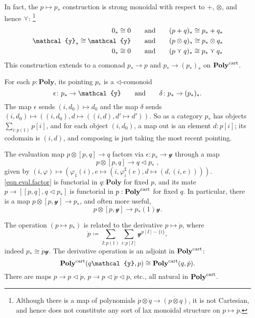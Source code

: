 \documentclass[11pt, one side, article]{memoir}
\theoremstyle{definition}
\theoremstyle{plain}
\newcommand{\Cat}[1]{\mathbf{#1}}%
\newcommand{\tn}[1]{\textnormal{#1}}
\newcommand{\yon}{{\mathcal{y}}}
\newcommand{\poly}{\Cat{Poly}}
\newcommand{\polycart}{\poly^{\tn{cart}}}
\newcommand{\0}{\textsf{0}}
\newcommand{\1}{\tn{\textsf{1}}}
\newcommand{\tri}{\mathbin{\triangleleft}}
\newcommand{\hh}[2][]{#1 \tn{#2} #1}
\newcommand{\qqand}{\hh[\qquad]{and}}
\newcommand{\OR}{\curlyvee}
\begin{document}
In fact, the $p\mapsto p_*$ construction is strong monoidal with respect to $+$, $\otimes$, and hence $\OR$:%
\footnote{Although there is a map of polynomials $\dot{p}\otimes\dot{q}\to\dot{(p\otimes q)}$, it is not Cartesian, and hence does not constitute any sort of lax monoidal structure on $p\mapsto\dot{p}$.}
\begin{align}
	0_*\cong 0
	&\qqand
	(p+q)_*\cong p_*+q_*\\
	\yon_*\cong\yon
	&\qqand
	(p\otimes q)_*\cong p_*\otimes q_*\\
	0_*\cong0
	&\qqand
	(p\OR q)_*\cong p_*\OR q_*
\end{align}
This construction extends to a comonad $p_*\to p$ and $p_*\to (p_*)_*$ on $\polycart$. 

For each $p:\poly$, its pointing $p_*$ is a $\tri$-comonoid
\begin{equation}\label{eqn.pointing_comonad}
	\epsilon\colon p_*\to\yon
	\qqand
	\delta\colon p_*\to (p_*)_*.
\end{equation}
The map $\epsilon$ sends $(i,d_0)\mapsto d_0$ and the map $\delta$ sends $(i,d_0)\mapsto((i,d_0), d\mapsto ((i,d), d'\mapsto d'))$. So as a category $p_*$ has objects $\sum_{i:p(1)}p[i]$, and for each object $(i,d_0)$, a map out is an element $d:p[i]$; its codomain is $(i,d)$, and composing is just taking the most recent pointing.

The evaluation map $p\otimes [p,q]\to q$ factors via $\epsilon\colon p_*\to \yon$ through a map
\begin{equation}\label{eqn.eval.factor}
	p\otimes [p,q]\to q\tri p_*\;,
\end{equation}
given by $(i,\varphi)\mapsto (\varphi_1(i),e\mapsto(i,\varphi^\sharp_i(e),d\mapsto(d,(i,e))))$. \cref{eqn.eval.factor} is functorial in $q:\poly$ for fixed $p$, and its mate $p\to[[p,q],q\tri p_*]$ is functorial in $p:\polycart$ for fixed $q$. In particular, there is a map $p\otimes[p,\yon]\to p_*$, and often more useful,
\begin{equation}
	p\otimes [p,\yon]\to p_*(1)\yon.
\end{equation}

The operation $(p\mapsto p_*)$ is related to the derivative $p\mapsto\dot{p}$, where
\begin{equation}
\dot{p}\coloneqq\sum_{I:p(1)}\sum_{i:p[I]}\yon^{p[I]-\{i\}},
\end{equation}
indeed $p_*\cong\dot{p}\yon$. The derivative operation is an adjoint in $\polycart$:
\begin{equation}
  \polycart(q\yon,p)\cong
  \polycart(q,\dot{p}).
\end{equation}
There are maps $p\to p\tri\dot{p}$, $p\to p\tri\dot{p}\tri\ddot{p}$, etc., all natural in $\polycart$. 
\end{document}
